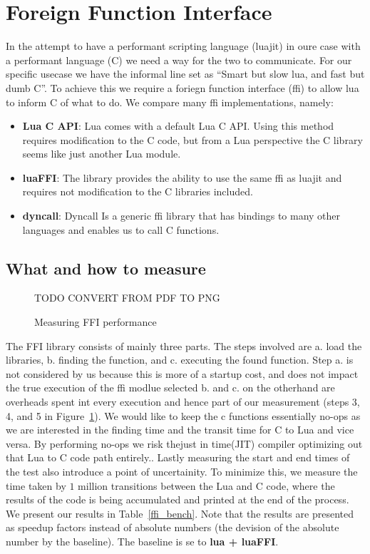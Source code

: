 \section{Foreign Function Interface}
\label{ffi}

In the attempt to have a performant scripting language (luajit) in oure case
with a performant language (C) we need a way for the two to communicate.
For our specific usecase we have the informal line set as ``Smart but slow lua,
and fast but dumb C''.
To achieve this we require a foriegn function interface (ffi) to allow lua to
inform C of what to do.
We compare many ffi implementations, namely:
\begin{itemize}
  \item {\bf Lua C API}: Lua comes with a default Lua C API. Using this method
    requires modification to the C code, but from a Lua perspective the C
    library seems like just another Lua module.
  \item {\bf luaFFI}: The library provides the ability to use the same ffi as
    luajit and requires not modification to the C libraries included.
  \item {\bf dyncall}: Dyncall\cite{dyncall} Is a generic ffi library that has
    bindings to many other languages and enables us to call C functions.  
\end{itemize}

\subsection{What and how to measure}
\begin{figure}[h]
\caption{Measuring FFI performance}
\centering
TODO CONVERT FROM PDF TO PNG

\label{ffi_fig}
\end{figure} 

The FFI library consists of mainly three parts. 
The steps involved are a. load the libraries, b. finding the function, and c. executing the found function.
Step a. is not considered by us because this is more of a startup cost, and does not impact the true execution of the ffi modlue selected
 b. and c. on the otherhand are overheads spent int every execution and hence part of our measurement (steps 3, 4, and 5 in Figure~\ref{ffi_fig}).
We would like to keep the c functions essentially no-ops as we are interested in the finding time and the transit time for C to Lua and vice versa.
By performing no-ops we risk thejust in time(JIT) compiler optimizing out that Lua to C code path entirely..
Lastly measuring the start and end times of the test also introduce a point of uncertainity. To minimize this, we measure the time taken by $1$ million transitions between the Lua and C code, where the results of the code is being accumulated and printed at the end of the process.
We present our results in Table~\ref{ffi_bench}. Note that the results are presented as speedup factors instead of absolute numbers (the devision of the absolute number by the baseline). The baseline is se to {\bf lua + luaFFI}.

